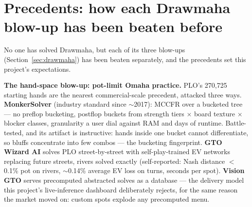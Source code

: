 \section{Precedents: how each Drawmaha blow-up has been beaten before}\label{sec:precedents}

No one has solved Drawmaha, but each of its three blow-ups (Section~\ref{sec:drawmaha}) has been beaten separately, and the precedents set this project's expectations.

\textbf{The hand-space blow-up: pot-limit Omaha practice.} PLO's 270{,}725 starting hands are the nearest commercial-scale precedent, attacked three ways. \textbf{MonkerSolver} (industry standard since $\sim$2017): MCCFR over a bucketed tree --- no preflop bucketing, postflop buckets from strength tiers $\times$ board texture $\times$ blocker classes, granularity a user dial against RAM and days of runtime. Battle-tested, and its artifact is instructive: hands inside one bucket cannot differentiate, so bluffs concentrate into few combos --- the bucketing fingerprint. \textbf{GTO Wizard AI} solves PLO street-by-street with self-play-trained EV networks replacing future streets, rivers solved exactly (self-reported: Nash distance $<$0.1\% pot on rivers, $\sim$0.14\% average EV loss on turns, seconds per spot). \textbf{Vision GTO} serves precomputed abstracted solves as a database --- the delivery model this project's live-inference dashboard deliberately rejects, for the same reason the market moved on: custom spots explode any precomputed menu.


